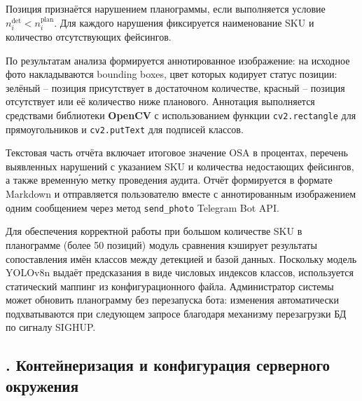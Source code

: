 {	\par \redline Позиция признаётся нарушением планограммы, если выполняется условие $n_i^{\mathrm{det}} < n_i^{\mathrm{plan}}$.
	Для каждого нарушения фиксируется наименование SKU и количество отсутствующих фейсингов.
	\par \redline По результатам анализа формируется аннотированное изображение: на исходное фото накладываются bounding boxes, цвет которых кодирует статус позиции: зелёный {--} позиция присутствует в достаточном количестве, красный {--} позиция отсутствует или её количество ниже планового.
	Аннотация выполняется средствами библиотеки \textbf{OpenCV} с использованием функции \texttt{cv2.rectangle} для прямоугольников и \texttt{cv2.putText} для подписей классов.
	\par \redline Текстовая часть отчёта включает итоговое значение OSA в процентах, перечень выявленных нарушений с указанием SKU и количества недостающих фейсингов, а также временну́ю метку проведения аудита.
	Отчёт формируется в формате Markdown и отправляется пользователю вместе с аннотированным изображением одним сообщением через метод \texttt{send\_photo} Telegram Bot API.
	\par \redline Для обеспечения корректной работы при большом количестве SKU в планограмме (более 50 позиций) модуль сравнения кэширует результаты сопоставления имён классов между детекцией и базой данных.
	Поскольку модель YOLOv8n выдаёт предсказания в виде числовых индексов классов, используется статический маппинг из конфигурационного файла.
	Администратор системы может обновить планограмму без перезапуска бота: изменения автоматически подхватываются при следующем запросе благодаря механизму перезагрузки БД по сигналу SIGHUP.
	\par
}

\subtitlespace

\subsection*{
	\gostTitleFont
	\redline
	\thechaptercntr .\thesubchaptercntr \spc
	Контейнеризация и конфигурация серверного окружения
} \addtocounter{subchaptercntr}{1}

\subtitlespace

